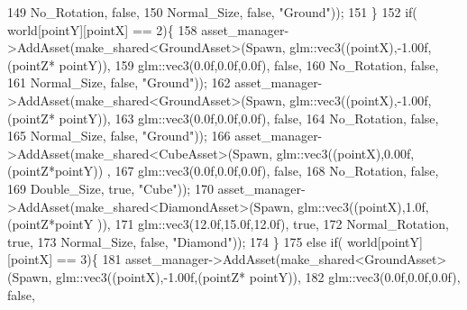 \begin{DoxyCode}
149                                                              No\_Rotation, \textcolor{keyword}{false},
150                                                              Normal\_Size, \textcolor{keyword}{false}, \textcolor{stringliteral}{"Ground"}));
151    \}
152    \textcolor{keywordflow}{if}( world[pointY][pointX] == 2)\{
158             asset\_manager->AddAsset(make\_shared<GroundAsset>(Spawn, glm::vec3((pointX),-1.00f,(pointZ*
      pointY)),
159                                                              glm::vec3(0.0f,0.0f,0.0f), \textcolor{keyword}{false},
160                                                              No\_Rotation, \textcolor{keyword}{false},
161                                                              Normal\_Size, \textcolor{keyword}{false}, \textcolor{stringliteral}{"Ground"}));
162             asset\_manager->AddAsset(make\_shared<GroundAsset>(Spawn, glm::vec3((pointX),-1.00f,(pointZ*
      pointY)),
163                                                              glm::vec3(0.0f,0.0f,0.0f), \textcolor{keyword}{false},
164                                                              No\_Rotation, \textcolor{keyword}{false},
165                                                              Normal\_Size, \textcolor{keyword}{false}, \textcolor{stringliteral}{"Ground"}));
166             asset\_manager->AddAsset(make\_shared<CubeAsset>(Spawn, glm::vec3((pointX),0.00f,(pointZ*pointY))
      , 
167                                                            glm::vec3(0.0f,0.0f,0.0f), \textcolor{keyword}{false},
168                                                            No\_Rotation, \textcolor{keyword}{false},
169                                                            Double\_Size, \textcolor{keyword}{true}, \textcolor{stringliteral}{"Cube"}));
170             asset\_manager->AddAsset(make\_shared<DiamondAsset>(Spawn, glm::vec3((pointX),1.0f,(pointZ*pointY
      )), 
171                                                               glm::vec3(12.0f,15.0f,12.0f), \textcolor{keyword}{true},
172                                                               Normal\_Rotation, \textcolor{keyword}{true},
173                                                               Normal\_Size, \textcolor{keyword}{false}, \textcolor{stringliteral}{"Diamond"}));
174    \}
175    \textcolor{keywordflow}{else} \textcolor{keywordflow}{if}( world[pointY][pointX] == 3)\{
181             asset\_manager->AddAsset(make\_shared<GroundAsset>(Spawn, glm::vec3((pointX),-1.00f,(pointZ*
      pointY)),
182                                                              glm::vec3(0.0f,0.0f,0.0f), \textcolor{keyword}{false},

\end{DoxyCode}
